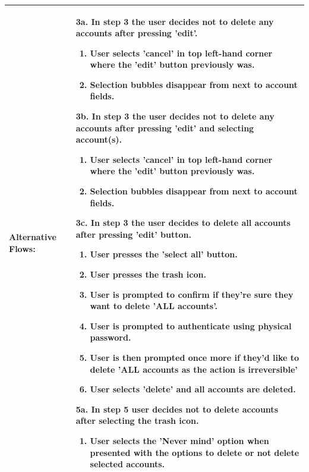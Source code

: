\documentclass[stu]{apa7}
\newcommand{\nextitemblank}{\par\hspace*{\labelsep}\hspace*{\labelsep}}
\begin{document}
{\begin{xltabular}{\textwidth}{|l|X|}
  Alternative Flows: & 
    \nextitemblank 3a. In step 3 the user decides not to delete any accounts after pressing 'edit'.
      \begin{enumerate}
        \item User selects 'cancel' in top left-hand corner where the 'edit' button previously was.
        \item Selection bubbles disappear from next to account fields.
      \end{enumerate}
    \nextitemblank 3b. In step 3 the user decides not to delete any accounts after pressing 'edit' and selecting account(s).  
      \begin{enumerate}
        \item User selects 'cancel' in top left-hand corner where the 'edit' button previously was.
        \item Selection bubbles disappear from next to account fields.
      \end{enumerate}
    \nextitemblank 3c. In step 3 the user decides to delete all accounts after pressing 'edit' button.
      \begin{enumerate}
        \item User presses the 'select all' button.
        \item User presses the trash icon.
        \item User is prompted to confirm if they're sure they want to delete 'ALL accounts'.
        \item User is prompted to authenticate using physical password.
        \item User is then prompted once more if they'd like to delete 'ALL accounts as the action is irreversible'
        \item User selects 'delete' and all accounts are deleted.
      \end{enumerate}
    \nextitemblank 5a. In step 5 user decides not to delete accounts after selecting the trash icon.
      \begin{enumerate}
        \item User selects the 'Never mind' option when presented with the options to delete or not delete selected accounts. 
      \end{enumerate} \\ \hline


\end{xltabular}}
\end{document}
